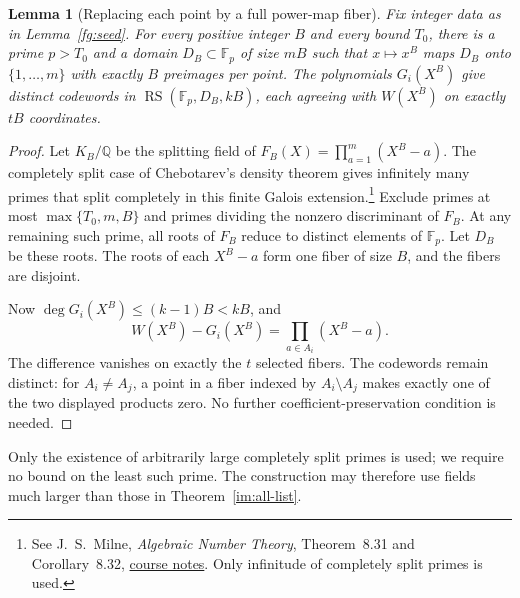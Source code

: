 \documentclass[11pt,letterpaper]{article}
\newtheorem{lemma}[theorem]{Lemma}
\theoremstyle{definition}
\theoremstyle{remark}
\newcommand{\F}{\mathbb F}
\newcommand{\RS}{\operatorname{RS}}
\begin{document}
\begin{lemma}[Replacing each point by a full power-map fiber]\label{fg:lift}
Fix integer data as in Lemma~\ref{fg:seed}. For every positive integer $B$
and every bound $T_0$, there is a prime $p>T_0$ and a domain
$D_B\subset\F_p$ of size $mB$ such that $x\mapsto x^B$ maps $D_B$ onto
$\{1,\ldots,m\}$ with exactly $B$ preimages per point. The polynomials
$G_i(X^B)$ give distinct codewords in $\RS(\F_p,D_B,kB)$, each agreeing
with $W(X^B)$ on exactly $tB$ coordinates.
\end{lemma}
\begin{proof}
Let $K_B/\mathbb Q$ be the splitting field of
$F_B(X)=\prod_{a=1}^m(X^B-a)$. The completely split case of Chebotarev's
density theorem gives infinitely many primes that split completely in
this finite Galois extension.\footnote{See J.~S.~Milne,
\emph{Algebraic Number Theory}, Theorem~8.31 and Corollary~8.32,
\href{https://www.jmilne.org/math/CourseNotes/ANTc.pdf}{course notes}.
Only infinitude of completely split primes is used.} Exclude primes at most
$\max\{T_0,m,B\}$ and primes dividing the nonzero discriminant of $F_B$.
At any remaining such prime, all roots of $F_B$ reduce to distinct elements
of $\F_p$. Let $D_B$ be these roots. The roots of each $X^B-a$ form one
fiber of size $B$, and the fibers are disjoint.

Now $\deg G_i(X^B)\le(k-1)B<kB$, and
\[
 W(X^B)-G_i(X^B)=\prod_{a\in A_i}(X^B-a).
\]
The difference vanishes on exactly the $t$ selected fibers.
The codewords remain distinct: for $A_i\ne A_j$, a point in a fiber
indexed by $A_i\setminus A_j$ makes exactly one of the two displayed
products zero. No further coefficient-preservation condition is needed.
\end{proof}

Only the existence of arbitrarily large completely split primes is used;
we require no bound on the least such prime. The construction may therefore
use fields much larger than those in Theorem~\ref{im:all-list}.
\end{document}
